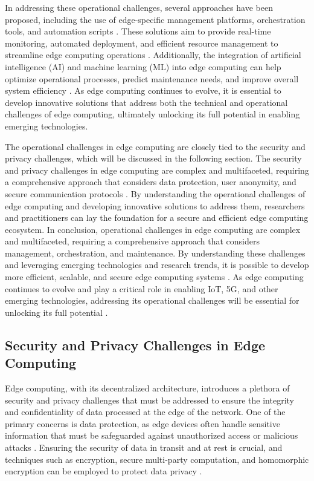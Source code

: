 \documentclass[11pt,a4paper]{article}
\begin{document}
In addressing these operational challenges, several approaches have been proposed, including the use of edge-specific management platforms, orchestration tools, and automation scripts \cite{arxiv:2407.17314}. These solutions aim to provide real-time monitoring, automated deployment, and efficient resource management to streamline edge computing operations \cite{arxiv:2309.05416}. Additionally, the integration of artificial intelligence (AI) and machine learning (ML) into edge computing can help optimize operational processes, predict maintenance needs, and improve overall system efficiency \cite{arxiv:1908.00080}. As edge computing continues to evolve, it is essential to develop innovative solutions that address both the technical and operational challenges of edge computing, ultimately unlocking its full potential in enabling emerging technologies.

The operational challenges in edge computing are closely tied to the security and privacy challenges, which will be discussed in the following section. The security and privacy challenges in edge computing are complex and multifaceted, requiring a comprehensive approach that considers data protection, user anonymity, and secure communication protocols \cite{arxiv:1602.00484}. By understanding the operational challenges of edge computing and developing innovative solutions to address them, researchers and practitioners can lay the foundation for a secure and efficient edge computing ecosystem. In conclusion, operational challenges in edge computing are complex and multifaceted, requiring a comprehensive approach that considers management, orchestration, and maintenance. By understanding these challenges and leveraging emerging technologies and research trends, it is possible to develop more efficient, scalable, and secure edge computing systems \cite{arxiv:2402.13056}. As edge computing continues to evolve and play a critical role in enabling IoT, 5G, and other emerging technologies, addressing its operational challenges will be essential for unlocking its full potential \cite{arxiv:2309.03420}.


\subsection{Security and Privacy Challenges in Edge Computing}


Edge computing, with its decentralized architecture, introduces a plethora of security and privacy challenges that must be addressed to ensure the integrity and confidentiality of data processed at the edge of the network. One of the primary concerns is data protection, as edge devices often handle sensitive information that must be safeguarded against unauthorized access or malicious attacks \cite{arxiv:1602.00484}. Ensuring the security of data in transit and at rest is crucial, and techniques such as encryption, secure multi-party computation, and homomorphic encryption can be employed to protect data privacy \cite{arxiv:1701.08680}.
\end{document}
